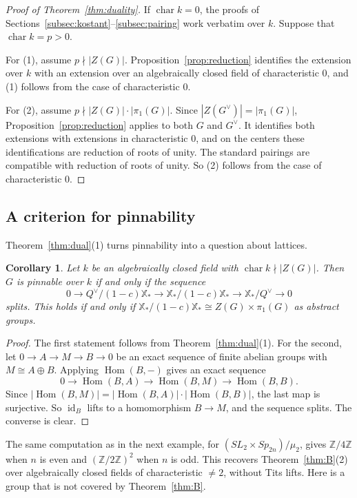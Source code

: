 \documentclass[psamsfonts]{amsart}
\newtheorem{cor}[thm]{Corollary}
\theoremstyle{definition}
\theoremstyle{remark}
\numberwithin{equation}{section}
\newcommand{\Z}{\mathbb{Z}}   %
\newcommand{\X}{\mathbb{X}}
\newcommand{\ra}{\rightarrow}
\DeclareMathOperator{\id}{id}
\DeclareMathOperator{\Hom}{Hom}
\DeclareMathOperator{\chara}{char}
\numberwithin{equation}{section}
\theoremstyle{plain}
\begin{document}
\begin{proof}[Proof of Theorem~\ref{thm:duality}]
If $\chara k=0$, the proofs of Sections~\ref{subsec:kostant}--\ref{subsec:pairing} work verbatim over $k$. Suppose that $\chara k=p>0$.

For (1), assume $p\nmid|Z(G)|$. Proposition~\ref{prop:reduction} identifies the extension over $k$ with an extension over an algebraically closed field of characteristic $0$, and (1) follows from the case of characteristic $0$.

For (2), assume $p\nmid|Z(G)|\cdot|\pi_1(G)|$. Since $|Z(G^\vee)|=|\pi_1(G)|$, Proposition~\ref{prop:reduction} applies to both $G$ and $G^\vee$. It identifies both extensions with extensions in characteristic $0$, and on the centers these identifications are reduction of roots of unity. The standard pairings are compatible with reduction of roots of unity. So (2) follows from the case of characteristic $0$.
\end{proof}

\subsection{A criterion for pinnability}
Theorem~\ref{thm:dual}(1) turns pinnability into a question about lattices.

\begin{cor}\label{cor:criterion}
Let $k$ be an algebraically closed field with $\chara k\nmid|Z(G)|$. Then $G$ is pinnable over $k$ if and only if the sequence
\[
0\ra Q^\vee/(1-c)\X_*\ra\X_*/(1-c)\X_*\ra\X_*/Q^\vee\ra0
\]
splits. This holds if and only if $\X_*/(1-c)\X_*\cong Z(G)\times\pi_1(G)$ as abstract groups.
\end{cor}

\begin{proof}
The first statement follows from Theorem~\ref{thm:dual}(1). For the second, let $0\ra A\ra M\ra B\ra0$ be an exact sequence of finite abelian groups with $M\cong A\oplus B$. Applying $\Hom(B,-)$ gives an exact sequence
\[
0\ra\Hom(B,A)\ra\Hom(B,M)\ra\Hom(B,B).
\]
Since $|\Hom(B,M)|=|\Hom(B,A)|\cdot|\Hom(B,B)|$, the last map is surjective. So $\id_B$ lifts to a homomorphism $B\ra M$, and the sequence splits. The converse is clear.
\end{proof}

The same computation as in the next example, for $(SL_2\times Sp_{2n})/\mu_2$, gives $\Z/4\Z$ when $n$ is even and $(\Z/2\Z)^2$ when $n$ is odd. This recovers Theorem~\ref{thm:B}(2) over algebraically closed fields of characteristic $\neq2$, without Tits lifts. Here is a group that is not covered by Theorem~\ref{thm:B}.
\end{document}
